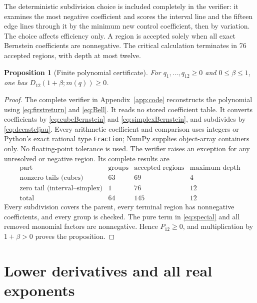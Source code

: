 \documentclass[11pt]{article}
\newtheorem{proposition}[theorem]{Proposition}
\begin{document}
The deterministic subdivision choice is included completely in the verifier:
it examines the most negative coefficient and scores the interval line and
the fifteen edge lines through it by the minimum new control coefficient,
then by variation. The choice affects efficiency only. A region is accepted
solely when all exact Bernstein coefficients are nonnegative. The critical
calculation terminates in 76 accepted regions, with depth at most twelve.

\begin{proposition}[Finite polynomial certificate]\label{prop:certificate}
For $q_1,\ldots,q_{12}\ge0$ and $0\le\beta\le1$, one has
$D_{12}(1+\beta;m(q))\ge0$.
\end{proposition}
\begin{proof}
The complete verifier in Appendix~\ref{app:code} reconstructs the polynomial
using \eqref{eq:firstreturn} and \eqref{eq:Bell}. It reads no stored coefficient
table. It converts coefficients by \eqref{eq:cubeBernstein} and
\eqref{eq:simplexBernstein}, and subdivides by \eqref{eq:decasteljau}.
Every arithmetic coefficient and comparison uses integers or Python's exact
rational type \texttt{Fraction}; NumPy supplies object-array containers only.
No floating-point tolerance is used. The verifier raises an exception for
any unresolved or negative region. Its complete results are
\[
\begin{array}{l|rrr}
\text{part}&\text{groups}&\text{accepted regions}&\text{maximum depth}\\\hline
\text{nonzero tails (cubes)}&63&69&4\\
\text{zero tail (interval--simplex)}&1&76&12\\\hline
\text{total}&64&145&12
\end{array}
\]
Every subdivision covers the parent, every terminal region has nonnegative
coefficients, and every group is checked. The pure term in
\eqref{eq:special} and all removed monomial factors are nonnegative. Hence
$P_{12}\ge0$, and multiplication by $1+\beta>0$ proves the proposition.
\end{proof}

\section{Lower derivatives and all real exponents}
\end{document}
